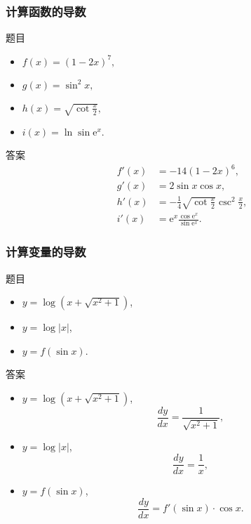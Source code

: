 \documentclass[
10pt,
aspectratio=43,
]{beamer}
\begin{document}
\begin{frame}
	\frametitle{计算函数的导数}
	\begin{block}{题目}
		\begin{itemize}
			\item $f(x)=(1-2 x)^7,$
			\item $g(x)=\sin ^2 x,$
			\item $h(x)=\sqrt{\cot \frac{x}{2}},$
			\item $i(x)=\ln \sin \mathrm{e}^x.$
		\end{itemize}
	\end{block}

	\pause

	\begin{exampleblock}{答案}
		\begin{align*}
			f'(x) & = -14(1-2x)^6,                                             \\
			g'(x) & = 2\sin x \cos x,                                          \\
			h'(x) & = -\frac{1}{4}\sqrt{\cot \frac{x}{2}} \csc^2 \frac{x}{2},  \\
			i'(x) & = \mathrm{e}^x\frac{\cos \mathrm{e}^x}{\sin \mathrm{e}^x}.
		\end{align*}
	\end{exampleblock}

\end{frame}

\begin{frame}
	\frametitle{计算变量的导数}

	\begin{block}{题目}
		\begin{itemize}
			\item $y = \log \left(x+\sqrt{x^2+1}\right)$,
			\item $y = \log |x|$,
			\item $y = f(\sin x)$.
		\end{itemize}
	\end{block}

	\pause

	\begin{exampleblock}{答案}
		{\small
			\begin{itemize}
				\item $y = \log \left(x+\sqrt{x^2+1}\right)$,
				      \[
					      \frac{dy}{dx} = \frac{1}{\sqrt{x^2+1}},
				      \]
				\item $y = \log |x|$,
				      \[
					      \frac{dy}{dx} = \frac{1}{x},
				      \]
				\item $y = f(\sin x)$,
				      \[
					      \frac{dy}{dx} = f'(\sin x) \cdot \cos x.
				      \]
			\end{itemize}
		}
	\end{exampleblock}
\end{frame}
\end{document}
